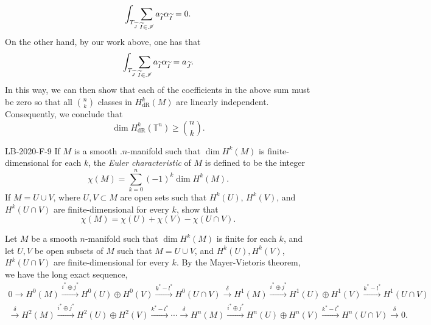 \documentclass{article}
\begin{document}
	\begin{equation*}
		\int_{T_{\widetilde{J}}}\sum_{\widetilde{I} \in \mathscr{I}}a_{\widetilde{I}}\alpha_{\widetilde{I}} = 0. 
	\end{equation*}
	On the other hand, by our work above, one has that 
	\begin{equation*}
		\int_{T_{\widetilde{J}}}\sum_{\widetilde{I} \in \mathscr{I}}a_{\widetilde{I}}\alpha_{\widetilde{I}} = a_{\widetilde{J}}. 
	\end{equation*}
	In this way, we can then show that each of the coefficients in the above sum must be zero so that all $\binom{n}{k}$ classes in $H^{k}_{\text{dR}}(M)$ are linearly independent. Consequently, we conclude that 
	\begin{equation*}
		\dim{H^{k}_{\text{dR}}(\mathbb{T}^{n})} \geq \binom{n}{k}. 
	\end{equation*}
	\begin{prb}{LB-2020-F-9}
		If $M$ is a smooth $.n$-manifold such that $\dim{H^{k}(M)}$ is finite-dimensional for each $k$, the \textit{Euler characteristic} of $M$ is defined to be the integer 
		\begin{equation*}
			\chi(M) = \sum_{k =0}^{n}(-1)^{k}\dim{H^{k}(M)}. 
		\end{equation*}
		If $M = U \cup V$, where $U, V \subset M$ are open sets such that $H^{k}(U)$, $H^{k}(V)$, and $H^{k}(U \cap V)$ are finite-dimensional for every $k$, show that 
		\begin{equation*}
			\chi(M) = \chi(U) + \chi(V) - \chi(U \cap V). 
		\end{equation*}
	\end{prb}
	Let $M$ be a smooth $n$-manifold such that $\dim{H^{k}(M)}$ is finite for each $k$, and let $U, V$ be open subsets of $M$ such that $M = U \cup V$, and $H^{k}(U), H^{k}(V)$, $H^{k}(U \cap V)$ are finite-dimensional for every $k$. By the Mayer-Vietoris theorem, we have the long exact sequence, 
	\begin{multline*}
		0 \to H^{0}(M) \xrightarrow{i^{\ast} \oplus j^{\ast}} H^{0}(U) \oplus H^{0}(V) \xrightarrow{k^{\ast} - l^{\ast}} H^{0}(U \cap V) \xrightarrow{\delta} H^{1}(M) \xrightarrow{i^{\ast} \oplus j^{\ast}} H^{1}(U) \oplus H^{1}(V) \xrightarrow{k^{\ast} - l^{\ast}} H^{1}(U \cap V) \\
		\xrightarrow{\delta} H^{2}(M) \xrightarrow{i^{\ast} \oplus j^{\ast}} H^{2}(U) \oplus H^{2}(V) \xrightarrow{k^{\ast}- l^{\ast}}\dotsm \xrightarrow{\delta} H^{n}(M)\xrightarrow{i^{\ast} \oplus j^{\ast}} H^{n}(U) \oplus H^{n}(V) \xrightarrow{k^{\ast} - l^{\ast}} H^{n}(U \cap V) \xrightarrow{\delta} 0. 
	\end{multline*}
\end{document}
